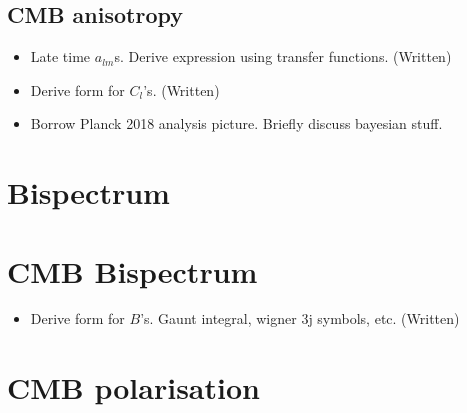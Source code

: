 \subsection{CMB anisotropy}
\begin{itemize}
	\item Late time $a_{lm}$s. Derive expression using transfer functions. (Written)
	\item Derive form for $C_l$'s. (Written)
	\item Borrow Planck 2018 analysis picture. Briefly discuss bayesian stuff.
\end{itemize}

\section{Bispectrum}


\section{CMB Bispectrum}
\begin{itemize}
	\item Derive form for $B$'s. Gaunt integral, wigner 3j symbols, etc. (Written)
	
\end{itemize}

\section{CMB polarisation}

